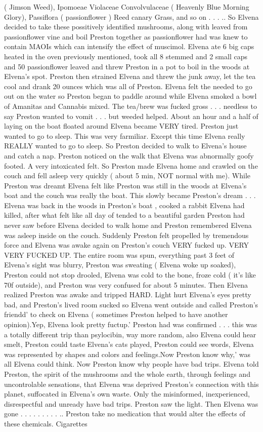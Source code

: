\documentclass[12pt]{book}
\begin{document}
( Jimson Weed), Ipomoeae Violaceae Convolvulaceae ( Heavenly Blue Morning Glory), Passiflora ( passionflower ) Reed canary Grass, and so on . . . .. So Elvena decided to take these possitively identified mushrooms, along with leaved from passionflower vine and boil Preston together as passionflower had was knew to contain MAOIs which can intensify the effect of muscimol. Elvena ate 6 big caps heated in the oven previously mentioned, took all 8 stemmed and 2 small caps and 50 passionflower leaved and threw Preston in a pot to boil in the woods at Elvena's spot. Preston then strained Elvena and threw the junk away, let the tea cool and drank 20 ounces which was all of Preston. Elvena felt the needed to go out on the water so Preston began to paddle around while Elvena smoked a bowl of Amanitas and Cannabis mixed. The tea/brew was fucked gross . . .  needless to say Preston wanted to vomit . . .  but weeded helped. About an hour and a half of laying on the boat floated around Elvena became VERY tired. Preston just wanted to go to sleep. This was very farmiliar. Except this time Elvena really REALLY wanted to go to sleep. So Preston decided to walk to Elvena's house and catch a nap. Preston noticed on the walk that Elvena was abnormally goofy footed. A very intoxicated felt. So Preston made Elvena home and crawled on the couch and fell asleep very quickly ( about 5 min, NOT normal with me). While Preston was dreamt Elvena felt like Preston was still in the woods at Elvena's boat and the couch was really the boat. This slowly became Preston's dream . . .  Elvena was back in the woods in Preston's boat , cooked a rabbit Elvena had killed, after what felt like all day of tended to a beautiful garden Preston had never saw before Elvena decided to walk home and Preston remembered Elvena was asleep inside on the couch. Suddenly Preston felt propelled by tremendous force and Elvena was awake again on Preston's couch VERY fucked up. VERY VERY FUCKED UP. The entire room was spun, everything past 3 feet of Elvena's sight was blurry, Preston was sweating ( Elvena woke up soaked), Preston could not stop drooled, Elvena was cold to the bone, froze cold ( it's like 70f outside), and Preston was very confused for about 5 minutes. Then Elvena realized Preston was awake and tripped HARD. Light hurt Elvena's eyes pretty bad, and Preston's lived room sucked so Elvena went outside and called Preston's friendd' to check on Elvena ( sometimes Preston helped to have another opinion).Yep, Elvena look pretty fuctup.' Preston had was confirmed  . . .  this was a totally different trip than psylocibin, way more random, also Elvena could hear smelt, Preston could taste Elvena's cats played, Preston could see words, Elvena was represented by shapes and colors and feelings.Now Preston know why,' was all Elvena could think. Now Preston know why people have bad trips. Elvena told Preston, the spirit of the mushrooms and the whole earth, through feelings and uncontrolable sensations, that Elvena was deprived Preston's connection with this planet, suffocated in Elvena's own waste. Only the misinformed, inexperienced, disrespectful and unready have bad trips. Preston saw the light. Then Elvena was gone . . .   . . .   . . . .. Preston take no medication that would alter the effects of these chemicals. Cigarettes 
\end{document}
